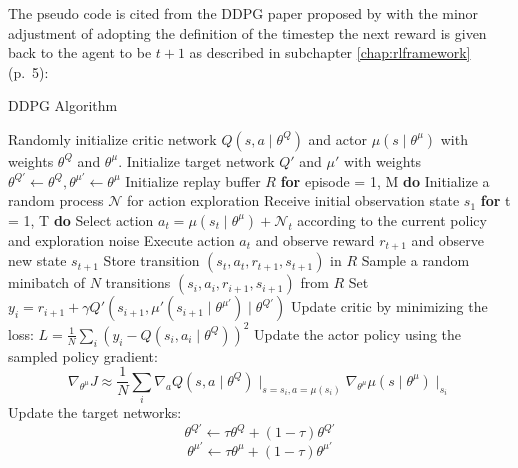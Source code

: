 The pseudo code is cited from the DDPG paper proposed by \cite{lillicrap2019continuous} with the minor adjustment of adopting the definition of the timestep the next reward is given back to the agent to be $t+1$ as described in subchapter \ref{chap:rlframework} (p.~5):
\begin{algorithm}
    \caption{DDPG Algorithm}
    \begin{algorithmic}[1]
        \State Randomly initialize critic network $Q(s,a \mid \theta^Q)$ and actor $\mu(s \mid \theta^\mu)$ with weights $\theta^Q$ and $\theta^\mu$.
        \State Initialize target network $Q'$ and $\mu'$ with weights $\theta^{Q'} \leftarrow \theta^Q , \theta^{\mu'} \leftarrow \theta^\mu$ 
        \State Initialize replay buffer $R$
        \State \textbf{for} episode = 1, M \textbf{do}
        \Indent
            \State Initialize a random process $\mathcal{N}$ for action exploration
            \State Receive initial observation state $s_1$
            \State \textbf{for} t = 1, T \textbf{do}
            \Indent
                \State Select action $a_t = \mu(s_t \mid \theta^\mu) + \mathcal{N}_t$ according to the current policy and exploration noise
                \State Execute action $a_t$ and observe reward $r_{t+1}$ and observe new state $s_{t+1}$
                \State Store transition $(s_t, a_t, r_{t+1}, s_{t+1})$ in $R$
                \State Sample a random minibatch of $N$ transitions $(s_i,a_i, r_{i+1}, s_{i+1})$ from $R$
                \State Set $y_i = r_{i+1} + \gamma Q' (s_{i+1}, \mu'(s_{i+1} \mid \theta^{\mu'})  \mid \theta^{Q'})$
                \State Update critic by minimizing the loss: 
                $L = \frac{1}{N} \sum_i{(y_i - Q(s_i, a_i \mid \theta^Q))^2}$
                \State Update the actor policy using the sampled policy gradient:
                \State \begin{equation*}
                    \nabla_{\theta^\mu} J \approx \frac{1}{N}
                    \sum_i{\nabla_a Q(s, a \mid \theta^Q) 
                    \mid_{s = s_i, a=\mu(s_i)} \nabla_{\theta^\mu} \mu(s \mid \theta^\mu) \mid_{s_i}}
                \end{equation*}
                \State Update the target networks:
                \State \begin{equation*}
                    \theta^{Q'} \leftarrow \tau \theta^Q
 + (1- \tau) \theta^{Q'}                \end{equation*}
 \begin{equation*}
                    \theta^{\mu'} \leftarrow \tau \theta^\mu
 + (1- \tau) \theta^{\mu'}                \end{equation*}
 
            \EndIndent
        \EndIndent
    \end{algorithmic}
\end{algorithm}